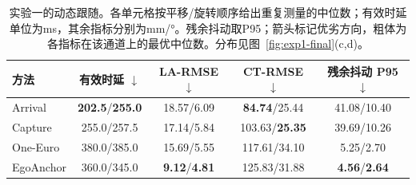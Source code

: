 \begin{table}[t]
\centering
\caption{实验一的动态跟随。各单元格按平移/旋转顺序给出重复测量的中位数；有效时延单位为ms，其余指标分别为mm/°。残余抖动取P95；箭头标记优劣方向，粗体为各指标在该通道上的最优中位数。分布见图~\ref{fig:exp1-final}(c,d)。}
\label{tab:exp1-dynamic}
\setlength{\tabcolsep}{2.2pt}
\renewcommand{\arraystretch}{1.10}
\begin{tabular}{@{}lcccc@{}}
\toprule
方法 &
\shortstack{有效时延\\$\downarrow$} &
\shortstack{LA-RMSE\\$\downarrow$} &
\shortstack{CT-RMSE\\$\downarrow$} &
\shortstack{残余抖动\\P95 $\downarrow$} \\
\midrule
Arrival   & \textbf{202.5}/\textbf{255.0} & 18.57/6.09 & \textbf{84.74}/25.44 & 41.08/10.40 \\
Capture   & 255.0/257.5 & 17.14/5.84 & 103.63/\textbf{25.35} & 39.69/10.26 \\
One-Euro  & 380.0/385.0 & 15.69/5.55 & 117.61/34.10 & 5.25/2.70 \\
EgoAnchor & 360.0/345.0 & \textbf{9.12}/\textbf{4.81} & 125.83/31.88 & \textbf{4.56}/\textbf{2.64} \\
\bottomrule
\end{tabular}
\end{table}
